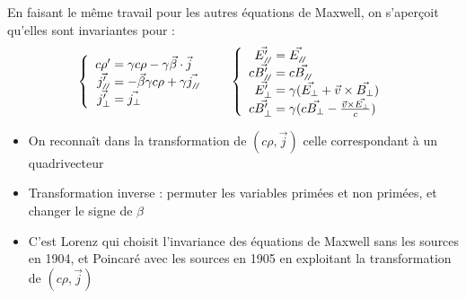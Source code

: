 En faisant le même travail pour les autres équations de Maxwell, on s'aperçoit qu'elles sont invariantes pour :
$$
\left\{ \begin{array}{r@{\;}l}
	c\rho '&=\gamma c\rho-\gamma\vec{\beta}\cdot\vec{j}\\
	\vec{j'_{\para}}&=-\vec{\beta}\gamma c\rho+\gamma\vec{j_{\para}}\\
	\vec{j'_{\perp}}&=\vec{j_{\perp}}
\end{array} \right.\\[10pt]\indent
\left\{ \begin{array}{r@{\;}l}
	\vec{E'_{\para}}&=\vec{E_{\para}}\\
	c\vec{B'_{\para}}&=c\vec{B_{\para}}\\
	\vec{E'_{\perp}}&=\gamma(\vec{E_{\perp}}+\vec{v}\times\vec{B_{\perp}})\\
	c\vec{B'_{\perp}}&=\gamma(c\vec{B_{\perp}}-\frac{\vec{v}\times\vec{E_{\perp}}}{c})
\end{array} \right.\\
$$


\begin{remarks}\hspace*{1em} 
\begin{itemize}
	\item On reconna\^it dans la transformation de $(c\rho,\vec{j})$ celle correspondant à un quadrivecteur
	\item Transformation inverse : permuter les variables primées et non primées, et changer le signe de $\beta$
	\item C'est Lorenz qui choisit l'invariance des équations de Maxwell sans les sources en 1904, et Poincaré avec les sources en 1905 en exploitant la transformation de $(c\rho,\vec{j})$
\end{itemize}
\end{remarks}

